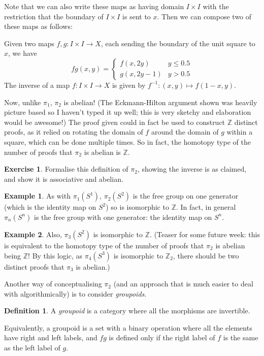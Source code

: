 \documentclass[a4paper,12pt]{article}
\newcommand{\ZZ}{\mathbb{Z}}
\theoremstyle{definition}
\newtheorem*{defn}{Definition}
\newtheorem*{exer}{Exercise}
\newtheorem*{example}{Example}
\begin{document}
Note that we can also write these maps as having domain $I\times I$ with the restriction that the boundary of $I\times I$ is sent to $x$.
Then we can compose two of these maps as follows:

Given two maps $f, g: I\times I\to X$, each sending the boundary of the unit square to $x$, we have
$$fg(x, y) = \begin{cases}
		f(x, 2y) & y\leq 0.5\\
		g(x, 2y-1) & y > 0.5
	\end{cases}$$
The inverse of a map $f: I\times I\to X$ is given by $f^{-1}: (x, y)\mapsto f(1-x, y)$.

Now, unlike $\pi_1$, $\pi_2$ is abelian!
(The Eckmann-Hilton argument shown was heavily picture based so I haven't typed it up well; this is very sketchy and elaboration would be awesome!)
The proof given could in fact be used to construct $\ZZ$ distinct proofs, as it relied on rotating the domain of $f$ around the domain of $g$ within a square, which can be done multiple times.
So in fact, the homotopy type of the number of proofs that $\pi_2$ is abelian is $\ZZ$.

\begin{exer}
Formalise this definition of $\pi_2$, showing the inverse is as claimed, and show it is associative and abelian.
\end{exer}

\begin{example}
As with $\pi_1(S^1)$, $\pi_2(S^2)$ is the free group on one generator (which is the identity map on $S^2$) so is isomorphic to $\ZZ$.
In fact, in general $\pi_n(S^n)$ is the free group with one generator: the identity map on $S^n$.
\end{example}

\begin{example}
Also, $\pi_3(S^2)$ is isomorphic to $\ZZ$.
(Teaser for some future week: this is equivalent to the homotopy type of the number of proofs that $\pi_2$ is abelian being $\ZZ$! By this logic, as $\pi_4(S^3)$ is isomorphic to $\ZZ_2$, there should be two distinct proofs that $\pi_3$ is abelian.)
\end{example}

Another way of conceptualising $\pi_2$ (and an approach that is much easier to deal with algorithmically) is to consider \emph{groupoids}.

\begin{defn}
A \emph{groupoid} is a category where all the morphisms are invertible.

Equivalently, a groupoid is a set with a binary operation where all the elements have right and left labels, and $fg$ is defined only if the right label of $f$ is the same as the left label of $g$.
\end{defn}
\end{document}
